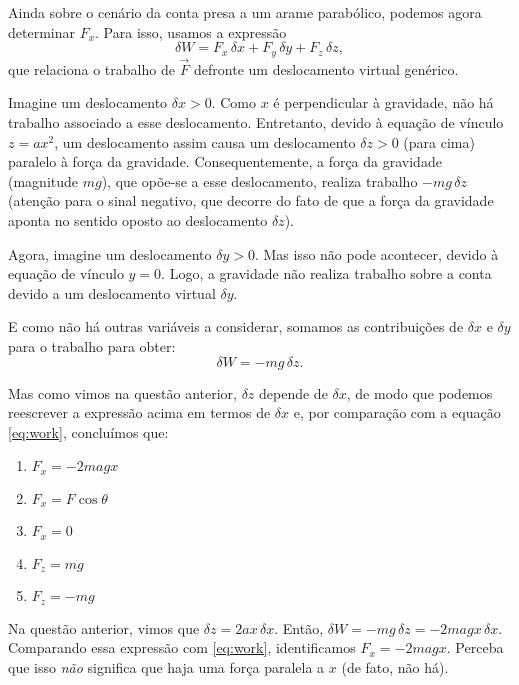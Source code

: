 \begin{question}
    Ainda sobre o cenário da conta presa a um arame parabólico, podemos agora determinar $F_x$.
    Para isso, usamos a expressão
    \begin{equation}\label{eq:work}
      \delta W = F_x\,\delta x + F_y\,\delta y + F_z\,\delta z,
    \end{equation}
    que relaciona o trabalho de $\vec F$ defronte um deslocamento virtual genérico.

    Imagine um deslocamento $\delta x > 0$.
    Como $x$ é perpendicular à gravidade, não há trabalho associado a esse deslocamento.
    Entretanto, devido à equação de vínculo $z = ax^2$, um deslocamento assim causa um deslocamento $\delta z > 0$ (para cima) paralelo à força da gravidade.
    Consequentemente, a força da gravidade (magnitude $mg$), que opõe-se a esse deslocamento, realiza trabalho $-mg\,\delta z$ (atenção para o sinal negativo, que decorre do fato de que a força da gravidade aponta no sentido oposto ao deslocamento $\delta z$).

    Agora, imagine um deslocamento $\delta y > 0$.
    Mas isso não pode acontecer, devido à equação de vínculo $y = 0$.
    Logo, a gravidade não realiza trabalho sobre a conta devido a um deslocamento virtual $\delta y$.

    E como não há outras variáveis a considerar, somamos as contribuições de $\delta x$ e $\delta y$ para o trabalho para obter:
    \begin{equation}
      \delta W = -mg\,\delta z.
    \end{equation}

    Mas como vimos na questão anterior, $\delta z$ depende de $\delta x$, de modo que podemos reescrever a expressão acima em termos de $\delta x$ e, por comparação com a equação \eqref{eq:work}, concluímos que:
    \begin{enumerate}
      \item $F_x = -2magx$ \rightanswer
      \item $F_x = F\cos\theta$
      \item $F_x = 0$
      \item $F_z = mg$
      \item $F_z = -mg$
    \end{enumerate}

    \begin{solution}
      Na questão anterior, vimos que $\delta z = 2ax\,\delta x$.
      Então, $\delta W = -mg\,\delta z = -2magx\,\delta x$.
      Comparando essa expressão com \eqref{eq:work}, identificamos $F_x = -2magx$.
      Perceba que isso \emph{não} significa que haja uma força paralela a $x$ (de fato, não há).
    \end{solution}
\end{question}